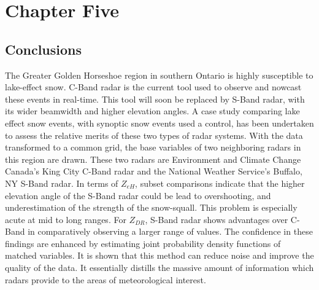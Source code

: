 \chapter{Chapter Five}
\section{Conclusions}
The Greater Golden Horseshoe region in southern Ontario is highly susceptible to lake-effect snow. C-Band radar is the current tool used to observe and nowcast
these events in real-time. This tool will soon be replaced by S-Band radar, with its wider beamwidth and higher elevation angles. A case study comparing lake
effect snow events, with synoptic snow events used a control, has been undertaken to assess the relative merits of these two types of radar systems. With the
data transformed to a common grid, the base variables of two neighboring radars in this region are drawn. These two radars are Environment and Climate Change
Canada's King City C-Band radar and the National Weather Service's Buffalo, NY S-Band radar. In terms of $Z_{eH}$, subset comparisons indicate that the higher
elevation angle of the S-Band radar could be lead to overshooting, and underestimation of the strength of the snow-squall. This problem is especially acute at
mid to long ranges. For $Z_{DR}$, S-Band radar shows advantages over C-Band in comparatively observing a larger range of values. The confidence in these findings are enhanced by estimating joint probability density functions of matched variables. It is shown that this method can reduce noise and improve the quality of the data. It essentially distills the massive amount of information which radars provide to the areas of meteorological interest.